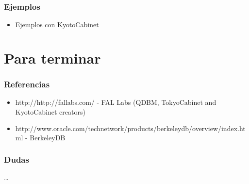 \documentclass[10pt]{beamer}
\begin{document}
  \begin{frame}
    \frametitle{Ejemplos}
    \begin{itemize}
      \item Ejemplos con KyotoCabinet
    \end{itemize}
  \end{frame}

  \section*{Para terminar}

  \begin{frame}
    \frametitle{Referencias}
    \begin{itemize}
      \item \small{http://http://fallabs.com/ - FAL Labs (QDBM, TokyoCabinet and KyotoCabinet creators)}
      \item \small{http://www.oracle.com/technetwork/products/berkeleydb/overview/index.html - BerkeleyDB}
    \end{itemize}
  \end{frame}

  \begin{frame}
    \frametitle{Dudas}
    \dots
  \end{frame}
\end{document}

